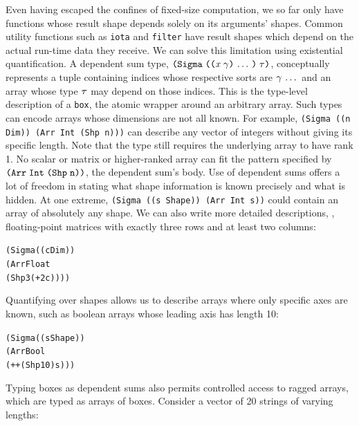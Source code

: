 Even having escaped the confines of fixed-size computation,
we so far only have functions whose result shape depends solely on its arguments' shapes.
Common utility functions such as {\tt iota} and {\tt filter}
have result shapes which depend on the actual run-time data they receive.
We can solve this limitation using existential quantification.
A dependent sum type,
\(\typedsum{\sequence{\notevar{\var}{\sort}}}{\type}\),
conceptually represents a tuple
containing indices whose respective sorts are $\mathit{\gamma} \, \ldots \,$
and an array whose type $\mathit{\tau}$ may depend on those indices.
This is the type-level description of a {\tt box},
the atomic wrapper around an arbitrary array.
Such types can encode arrays whose dimensions are not all known.
For example,
{\tt (Sigma ((n Dim)) (Arr Int (Shp n)))}
can describe any vector of integers without giving its specific length.
Note that the type still requires the underlying array to have rank 1.
No scalar or matrix or higher-ranked array can
fit the pattern specified by $\typearray{\text{\tt Int}}{\idxshape{\text{\tt n}}}$,
the dependent sum's body.
Use of dependent sums offers a lot of freedom in stating
what shape information is known precisely and what is hidden.
At one extreme,
{\tt (Sigma ((s Shape)) (Arr Int s))}
could contain an array of absolutely any shape.
We can also write more detailed descriptions,
\eg, floating-point matrices with exactly three rows and at least two columns:

\begin{alltt}
(Sigma ((c Dim))
  (Arr Float
       (Shp 3 (+ 2 c))))
\end{alltt}
Quantifying over shapes allows us to describe
arrays where only specific axes are known,
such as boolean arrays whose leading axis has length 10:

\begin{alltt}
(Sigma ((s Shape))
  (Arr Bool
       (++ (Shp 10) s)))
\end{alltt}

Typing boxes as dependent sums also permits controlled access to ragged arrays,
which are typed as arrays of boxes.
Consider a vector of 20 strings of varying lengths:

